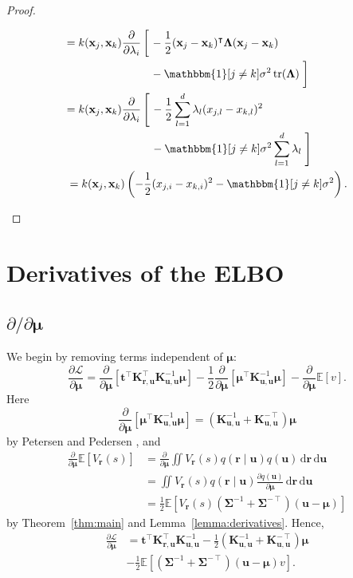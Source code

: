 \documentclass{mpaper}
\DeclareMathOperator{\tr}{tr}
\newcommand{\V}{V_{\mathbf{r}}}
\newcommand{\dx}{\,\mathrm{d}\mathbf{r}\,\mathrm{d}\mathbf{u}}
\newcommand{\Kuu}{\mathbf{K}_{\mathbf{u},\mathbf{u}}}
\newcommand{\Kru}{\mathbf{K}_{\mathbf{r},\mathbf{u}}}
\newcommand{\dm}{\frac{\partial}{\partial\bm\mu}}
\newcommand{\dl}{\frac{\partial}{\partial \lambda_i}}
\begin{document}
\begin{proof}
\begin{enumerate}
\begin{enumerate}
\begin{align*}
      &\begin{aligned}
        = k(\mathbf{x}_j, \mathbf{x}_k) \dl \left[ \vphantom{\frac{1}{2}} \right. &-\frac{1}{2}(\mathbf{x}_j - \mathbf{x}_k)^\intercal \bm\Lambda (\mathbf{x}_j - \mathbf{x}_k) \\
        &- \mathbbm{1}[j \ne k]\sigma^2\tr(\bm\Lambda) \left. \vphantom{\frac{1}{2}} \right]
      \end{aligned} \\
      &\begin{aligned}
        = k(\mathbf{x}_j, \mathbf{x}_k) \dl \left[ \vphantom{\sum_{k=1}^d} \right. &-\frac{1}{2} \sum_{l=1}^d \lambda_l (x_{j,l} - x_{k,l})^2 \\
        &- \mathbbm{1}[j \ne k]\sigma^2\sum_{l=1}^d \lambda_l \left. \vphantom{\sum_{l=1}^d} \right]
      \end{aligned} \\
      &= k(\mathbf{x}_j, \mathbf{x}_k) \left( -\frac{1}{2}(x_{j,i} - x_{k,i})^2 - \mathbbm{1}[j \ne k]\sigma^2 \right).
    \end{align*}
    \end{enumerate}
  \end{enumerate}
\end{proof}

\section{Derivatives of the ELBO} \label{appendix:derivatives}

\subsection{\texorpdfstring{$\partial/\partial\bm\mu$}{Derivative w.r.t. mu}}

We begin by removing terms independent of $\bm\mu$:
\[
  \frac{\partial\mathcal{L}}{\partial\bm\mu} =
  \dm[\mathbf{t}^\intercal\Kru^\intercal\Kuu^{-1}\bm\mu] - \frac{1}{2} \dm
  \left[ \bm\mu^\intercal \Kuu^{-1} \bm\mu \right] - \dm\mathbb{E}[v].
\]
Here
\[
  \dm \left[ \bm\mu^\intercal \Kuu^{-1} \bm\mu \right] = (\Kuu^{-1} +
  \Kuu^{-\intercal}) \bm\mu
\]
by Petersen and Pedersen \cite{petersen2008matrix}, and
\[
  \begin{split}
    \dm\mathbb{E}[\V(s)] &= \dm\iint \V(s) q(\mathbf{r} \mid \mathbf{u})
    q(\mathbf{u})\dx \\
    &= \iint \V(s) q(\mathbf{r} \mid \mathbf{u}) \frac{\partial
      q(\mathbf{u})}{\partial \bm\mu}\dx \\
    &= \frac{1}{2}\mathbb{E}[\V(s) (\bm\Sigma^{-1} +
    \bm\Sigma^{-\intercal})(\mathbf{u} - \bm\mu)]
  \end{split}
\]
by Theorem~\ref{thm:main} and Lemma~\ref{lemma:derivatives}. Hence,
\[
  \begin{split}
    \frac{\partial\mathcal{L}}{\partial\bm\mu} &=
    \mathbf{t}^\intercal\Kru^\intercal\Kuu^{-1} - \frac{1}{2} (\Kuu^{-1} +
    \Kuu^{-\intercal}) \bm\mu \\
    &- \frac{1}{2}\mathbb{E} \left[(\bm\Sigma^{-1} +
      \bm\Sigma^{-\intercal})(\mathbf{u} - \bm\mu) v \right].
  \end{split}
\]
\end{document}
